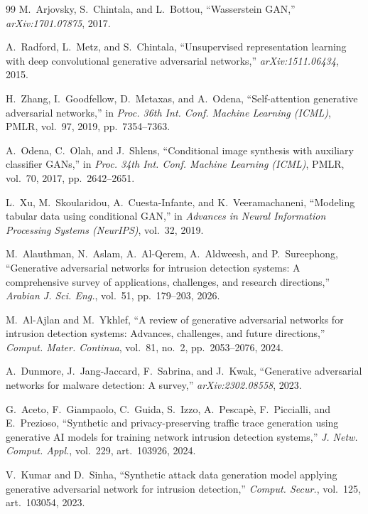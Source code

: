 \documentclass[11pt,a4paper]{article}
\begin{document}
\begin{thebibliography}{99}
 M.~Arjovsky, S.~Chintala, and L.~Bottou, ``Wasserstein GAN,''
\emph{arXiv:1701.07875}, 2017.

 A.~Radford, L.~Metz, and S.~Chintala, ``Unsupervised
representation learning with deep convolutional generative adversarial
networks,'' \emph{arXiv:1511.06434}, 2015.

 H.~Zhang, I.~Goodfellow, D.~Metaxas, and A.~Odena,
``Self-attention generative adversarial networks,'' in \emph{Proc. 36th Int.
Conf. Machine Learning (ICML)}, PMLR, vol.~97, 2019, pp.~7354--7363.

 A.~Odena, C.~Olah, and J.~Shlens, ``Conditional image synthesis
with auxiliary classifier GANs,'' in \emph{Proc. 34th Int. Conf. Machine
Learning (ICML)}, PMLR, vol.~70, 2017, pp.~2642--2651.

 L.~Xu, M.~Skoularidou, A.~Cuesta-Infante, and K.~Veeramachaneni,
``Modeling tabular data using conditional GAN,'' in \emph{Advances in Neural
Information Processing Systems (NeurIPS)}, vol.~32, 2019.

 M.~Alauthman, N.~Aslam, A.~Al-Qerem, A.~Aldweesh, and
P.~Sureephong, ``Generative adversarial networks for intrusion detection
systems: A comprehensive survey of applications, challenges, and research
directions,'' \emph{Arabian J. Sci. Eng.}, vol.~51, pp.~179--203, 2026.

 M.~Al-Ajlan and M.~Ykhlef, ``A review of generative
adversarial networks for intrusion detection systems: Advances, challenges, and
future directions,'' \emph{Comput. Mater. Continua}, vol.~81, no.~2,
pp.~2053--2076, 2024.

 A.~Dunmore, J.~Jang-Jaccard, F.~Sabrina, and J.~Kwak,
``Generative adversarial networks for malware detection: A survey,''
\emph{arXiv:2302.08558}, 2023.

 G.~Aceto, F.~Giampaolo, C.~Guida, S.~Izzo, A.~Pescap\`e,
F.~Piccialli, and E.~Prezioso, ``Synthetic and privacy-preserving traffic trace
generation using generative AI models for training network intrusion detection
systems,'' \emph{J. Netw. Comput. Appl.}, vol.~229, art.~103926, 2024.

 V.~Kumar and D.~Sinha, ``Synthetic attack data generation model
applying generative adversarial network for intrusion detection,'' \emph{Comput.
Secur.}, vol.~125, art.~103054, 2023.


\end{thebibliography}
\end{document}
